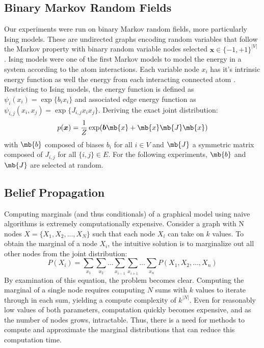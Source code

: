 \documentclass{article}
\newcommand{\alireza}[1]{\textcolor{orange}{[Alireza : #1]}}
\begin{document}
\subsection{Binary Markov Random Fields}
Our experiments were run on binary Markov random fields, more particularly Ising models. These are undirected graphs encoding random variables that follow the Markov property with binary random variable nodes selected  $\bm{x} \in \{-1, +1\}^{|V|}$ . Ising models were one of the first Markov models to model the energy in a system according to the atom interactions. Each variable node $x_i$ has it's intrinsic energy function as well the energy from each interacting connected atom \cite{pgm_book}.
Restricting to Ising models, the energy function is defined as $\psi_i(x_i) = \exp\{ b_i x_i\}$ and associated edge energy function as $\psi_{i,j}(x_i, x_j) = \exp\{ J_{i, j} x_i x_j\}$. Deriving the exact joint distribution:
\begin{align*}
    p(\bm{x}) = \frac{1}{Z} \exp(\bm{b} \mb{x}+\mb{x}\mb{J}\mb{x})
\end{align*}
with $\mb{b}$ composed of biases $b_i$ for all $i \in V$ and $\mb{J}$ a symmetric matrix composed of $J_{i,j}$ for all $\{i, j\} \in E$. For the following experiments, $\mb{b}$ and $\mb{J}$ are selected at random.

\subsection{Belief Propagation}

Computing marginals (and thus conditionals) of a graphical model using naive algorithms is extremely computationally expensive. Consider a graph with N nodes $ X = \{X_1, X_2, ..., X_N\}$ such that each node $X_i$ can take on $k$ values. To obtain the marginal of a node $X_i$, the intuitive solution is to marginalize out all other nodes from the joint distribution: 
\begin{equation}
P(X_i) = \sum_{x_1}\sum_{x_2}\ldots\sum_{x_{i-1}}\sum_{x_{i+1}}\ldots\sum_{x_n} P(X_1, X_2, \ldots, X_n)
\end{equation}
By examination of this equation, the problem becomes clear. Computing the marginal of a single node requires computing $N$ sums with $k$ values to iterate through in each sum, yielding a compute complexity of $k^{|N|}$. Even for reasonably low values of both parameters, computation quickly becomes expensive, and as the number of nodes grows, intractable. Thus, there is a need for methods to compute and approximate the marginal distributions that can reduce this computation time. 
\end{document}
